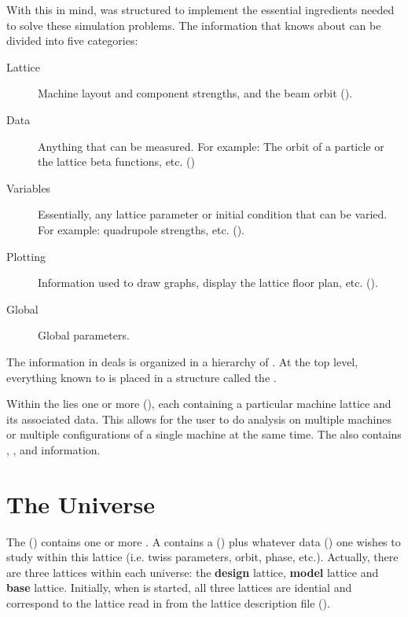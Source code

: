 With this in mind, \tao was structured to implement the essential
ingredients needed to solve these simulation problems.  
The information that \tao knows about can be divided into five
categories:
\begin{description}
  \item[Lattice] \Newline   
Machine layout and component strengths, and the beam orbit ().
  \item[Data] \Newline
Anything that can be measured.
For example: The orbit of a particle or the lattice beta 
functions, etc. ()
  \item[Variables] \Newline
Essentially, any lattice parameter or initial condition that can be varied.
For example: quadrupole strengths, etc. ().
  \item[Plotting]  \Newline
Information used to draw graphs, display the lattice 
floor plan, etc. ().
  \item[Global] \Newline
Global parameters.
\end{description}

The information in \tao deals is organized in a hierarchy of
. At the top level, everything known to \tao is
placed in a structure called the .

Within the  lies one or more 
(), each  containing a particular
machine lattice and its associated data. This allows for the user to
do analysis on multiple machines or multiple configurations of a
single machine at the same time. The  also contains
, , and  information.

\section{The Universe}
\label{s:universe}

The \tao {} () contains one or
more .  A  contains a 
() plus whatever data () one wishes to
study within this lattice (i.e. twiss parameters, orbit, phase,
etc.). Actually, there are three lattices within each universe: the
\textbf{design} lattice, \textbf{model} lattice and \textbf{base}
lattice. Initially, when \tao is started, all three lattices are
idential and correspond to the lattice read in from the lattice
description file ().

